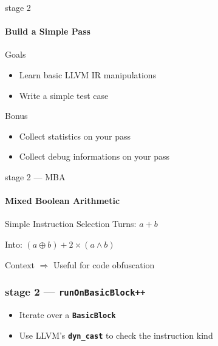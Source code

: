 \documentclass[14pt]{beamer}
\newcommand{\Code}[1]{\textbf{\texttt{#1}}}
\begin{document}
    \begin{frame}{stage 2}

        \framesubtitle{Build a Simple Pass}

        \begin{block}{Goals}
            \begin{itemize}
                \item Learn basic LLVM IR manipulations
                \item Write a simple test case
            \end{itemize}

        \end{block}

        \begin{alertblock}{Bonus}
            \begin{itemize}
                \item Collect statistics on your pass
                \item Collect debug informations on your pass
            \end{itemize}
        \end{alertblock}

    \end{frame}

    \begin{frame}{stage 2 --- MBA}
        \framesubtitle{Mixed Boolean Arithmetic}

        \begin{alertblock}{Simple Instruction Selection}
            Turns: $a + b$

            Into: $(a \oplus b) + 2 \times (a \wedge b)$
        \end{alertblock}

        \begin{block}{Context}
            \alert{$\Rightarrow$} Useful for code obfuscation
        \end{block}

    \end{frame}

    \begin{frame}[containsverbatim]
    \frametitle{stage 2 --- \texttt{runOnBasicBlock++}}
    \begin{itemize}
        \item Iterate over a \Code{BasicBlock}
        \item Use LLVM's \Code{dyn\_cast} to check the instruction kind
    \end{itemize}
	\hspace{-1em}
    \begin{minipage}{\textwidth}
        \footnotesize
        
    \end{minipage}
    \end{frame}
\end{document}
